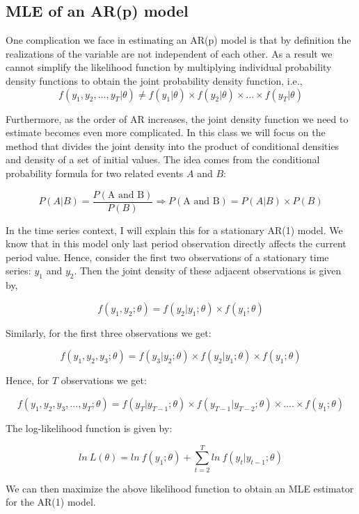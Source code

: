\documentclass[]{book}
\theoremstyle{definition}
\theoremstyle{definition}
\theoremstyle{definition}
\theoremstyle{remark}
\begin{document}
\hypertarget{mle-of-an-arp-model}{%
\subsection{MLE of an AR(p) model}\label{mle-of-an-arp-model}}

One complication we face in estimating an AR(p) model is that by
definition the realizations of the variable are not independent of each
other. As a result we cannot simplify the likelihood function by
multiplying individual probability density functions to obtain the joint
probability density function, i.e.,
\[ f(y_1,y_2,\dots,y_T|\theta) \neq f(y_1|\theta)\times f(y_2|\theta)\times \dots \times f(y_T|\theta)\]

Furthermore, as the order of AR increases, the joint density function we
need to estimate becomes even more complicated. In this class we will
focus on the method that divides the joint density into the product of
conditional densities and density of a set of initial values. The idea
comes from the conditional probability formula for two related events
\(A\) and \(B\):

\[ P(A|B) =\frac{P(\text{A and B})}{P(B)} \Rightarrow P(\text{A and B}) = P(A|B)\times P(B) \]

In the time series context, I will explain this for a stationary AR(1)
model. We know that in this model only last period observation directly
affects the current period value. Hence, consider the first two
observations of a stationary time series: \(y_1\) and \(y_2\). Then the
joint density of these adjacent observations is given by,

\[ f(y_1,y_2;\theta)= f(y_2|y_1; \theta)\times f(y_1;\theta)\]

Similarly, for the first three observations we get:

\[ f(y_1,y_2,y_3;\theta)= f(y_3|y_2; \theta)\times f(y_2|y_1; \theta) \times f(y_1; \theta)\]

Hence, for \(T\) observations we get:

\[ f(y_1,y_2,y_3, ...,y_T; \theta)= f(y_T|y_{T-1};\theta)\times f(y_{T-1}|y_{T-2}; \theta)\times.... \times f(y_1; \theta)\]

The log-likelihood function is given by:

\[ ln \ L(\theta) = ln \ f(y_1;\theta) + \sum_{t=2}^{T} ln \ f(y_t|y_{t-1}; \theta)  \]

We can then maximize the above likelihood function to obtain an MLE
estimator for the AR(1) model.
\end{document}
